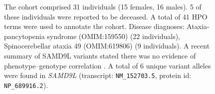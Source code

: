 \begin{figure}[htbp]
\vspace{2em}

\caption{ The cohort comprised 31 individuals (15 females, 16 males). 5 of these individuals were reported to be deceased. A total of 41 HPO terms were used to annotate the cohort. Disease diagnoses: Ataxia-pancytopenia syndrome (OMIM:159550) (22 individuals), Spinocerebellar ataxia 49 (OMIM:619806) (9 individuals). A recent summary of SAMD9L variants stated there was no evidence of phenotype–genotype correlation \cite{PMID_38594844}.
 A total of 6 unique variant alleles were found in \textit{SAMD9L} (transcript: \texttt{NM\_152703.5}, protein id: \texttt{NP\_689916.2}).}
\end{figure}
